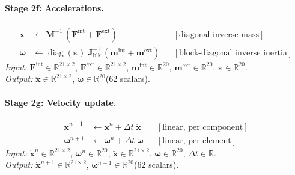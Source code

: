 \documentclass[11pt]{article}
\newcommand{\vect}[1]{\mathbf{#1}}
\newcommand{\mat}[1]{\mathbf{#1}}
\newcommand{\Real}{\mathbb{R}}
\begin{document}
\paragraph{Stage 2f: Accelerations.}
\begin{equation}
  \boxed{\;
  \begin{aligned}
    \ddot{\vect{x}} &\leftarrow \mat{M}^{-1}\,(\vect{F}^{\text{int}} + \vect{F}^{\text{ext}})
      && [\text{diagonal inverse mass}] \\
    \dot{\bm{\omega}} &\leftarrow \operatorname{diag}(\bm{\varepsilon})\;\mat{J}_{\text{blk}}^{-1}\,
      (\vect{m}^{\text{int}} + \vect{m}^{\text{ext}})
      && [\text{block-diagonal inverse inertia}]
  \end{aligned}
  \;}
  \label{eq:mat-accelerations}
\end{equation}
\textit{Input:} $\vect{F}^{\text{int}} \in \Real^{21 \times 2}$, $\vect{F}^{\text{ext}} \in \Real^{21 \times 2}$, $\vect{m}^{\text{int}} \in \Real^{20}$, $\vect{m}^{\text{ext}} \in \Real^{20}$, $\bm{\varepsilon} \in \Real^{20}$. \\
\textit{Output:} $\ddot{\vect{x}} \in \Real^{21 \times 2}$, $\dot{\bm{\omega}} \in \Real^{20}$\quad (62 scalars).

\paragraph{Stage 2g: Velocity update.}
\begin{equation}
  \boxed{\;
  \begin{aligned}
    \dot{\vect{x}}^{n+1} &\leftarrow \dot{\vect{x}}^n + \Delta t\;\ddot{\vect{x}}
      && [\text{linear, per component}] \\
    \bm{\omega}^{n+1} &\leftarrow \bm{\omega}^n + \Delta t\;\dot{\bm{\omega}}
      && [\text{linear, per element}]
  \end{aligned}
  \;}
  \label{eq:mat-vel-update}
\end{equation}
\textit{Input:} $\dot{\vect{x}}^n \in \Real^{21 \times 2}$, $\bm{\omega}^n \in \Real^{20}$, $\ddot{\vect{x}} \in \Real^{21 \times 2}$, $\dot{\bm{\omega}} \in \Real^{20}$, $\Delta t \in \Real$. \\
\textit{Output:} $\dot{\vect{x}}^{n+1} \in \Real^{21 \times 2}$, $\bm{\omega}^{n+1} \in \Real^{20}$\quad (62 scalars).
\end{document}
